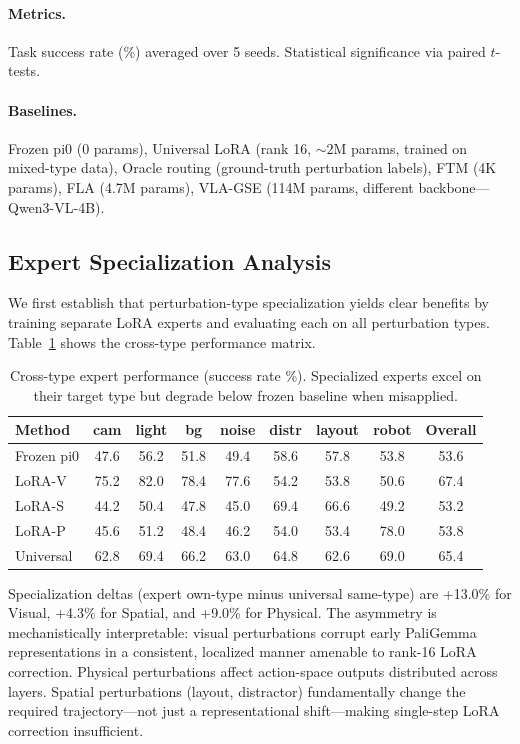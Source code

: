 \documentclass[letterpaper]{article}
\begin{document}
\paragraph{Metrics.} Task success rate (\%) averaged over 5 seeds.
Statistical significance via paired $t$-tests.

\paragraph{Baselines.} Frozen pi0 (0 params), Universal LoRA (rank 16, ${\sim}2$M params, trained on mixed-type data), Oracle routing (ground-truth perturbation labels), FTM (4K params), FLA (4.7M params), VLA-GSE (114M params, different backbone---Qwen3-VL-4B).

\subsection{Expert Specialization Analysis}

We first establish that perturbation-type specialization yields clear benefits by training separate LoRA experts and evaluating each on all perturbation types.
Table~\ref{tab:cross-type} shows the cross-type performance matrix.

\begin{table}[h]
\centering
\caption{Cross-type expert performance (success rate \%). Specialized experts excel on their target type but degrade below frozen baseline when misapplied.}
\label{tab:cross-type}
\small
\begin{tabular}{lcccccccc}
\toprule
Method & cam & light & bg & noise & distr & layout & robot & Overall \\
\midrule
Frozen pi0 & 47.6 & 56.2 & 51.8 & 49.4 & 58.6 & 57.8 & 53.8 & 53.6 \\
LoRA-V     & 75.2 & 82.0 & 78.4 & 77.6 & 54.2 & 53.8 & 50.6 & 67.4 \\
LoRA-S     & 44.2 & 50.4 & 47.8 & 45.0 & 69.4 & 66.6 & 49.2 & 53.2 \\
LoRA-P     & 45.6 & 51.2 & 48.4 & 46.2 & 54.0 & 53.4 & 78.0 & 53.8 \\
Universal  & 62.8 & 69.4 & 66.2 & 63.0 & 64.8 & 62.6 & 69.0 & 65.4 \\
\bottomrule
\end{tabular}
\end{table}

Specialization deltas (expert own-type minus universal same-type) are +13.0\% for Visual, +4.3\% for Spatial, and +9.0\% for Physical.
The asymmetry is mechanistically interpretable: visual perturbations corrupt early PaliGemma representations in a consistent, localized manner amenable to rank-16 LoRA correction.
Physical perturbations affect action-space outputs distributed across layers.
Spatial perturbations (layout, distractor) fundamentally change the required trajectory---not just a representational shift---making single-step LoRA correction insufficient.
\end{document}
